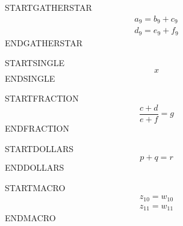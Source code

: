 \documentclass{article}
\newcommand{\SyntheticRows}{z_{10}=w_{10}\\z_{11}=w_{11}}
\begin{document}
\newpage
STARTGATHERSTAR
\begin{gather*}
  a_9 = b_9 + c_9 \\
  d_9 = e_9 + f_9
\end{gather*}
ENDGATHERSTAR

\newpage
STARTSINGLE
\begin{equation*}
  x
\end{equation*}
ENDSINGLE

\newpage
STARTFRACTION
\begin{equation*}
  \frac{c+d}{e+f}=g
\end{equation*}
ENDFRACTION

\newpage
STARTDOLLARS
$$
  p+q=r
$$
ENDDOLLARS

\newpage
STARTMACRO
\begin{align*}
  \SyntheticRows
\end{align*}
ENDMACRO
\end{document}
